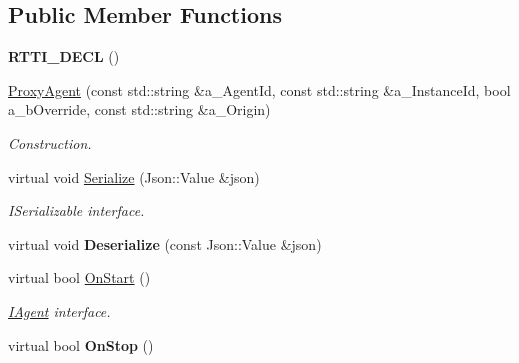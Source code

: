 \subsection*{Public Member Functions}
\begin{DoxyCompactItemize}
\item 
\mbox{\label{class_proxy_agent_ad0260a36883417b4ce4236017920db1c}} 
{\bfseries R\+T\+T\+I\+\_\+\+D\+E\+CL} ()
\item 
\mbox{\label{class_proxy_agent_a0a2258939df1d5e859ad0d94d0f27c47}} 
\hyperlink{class_proxy_agent_a0a2258939df1d5e859ad0d94d0f27c47}{Proxy\+Agent} (const std\+::string \&a\+\_\+\+Agent\+Id, const std\+::string \&a\+\_\+\+Instance\+Id, bool a\+\_\+b\+Override, const std\+::string \&a\+\_\+\+Origin)
\begin{DoxyCompactList}\small\item\em Construction. \end{DoxyCompactList}\item 
\mbox{\label{class_proxy_agent_ae4585a6d5136f5cca0fefc274df20c1b}} 
virtual void \hyperlink{class_proxy_agent_ae4585a6d5136f5cca0fefc274df20c1b}{Serialize} (Json\+::\+Value \&json)
\begin{DoxyCompactList}\small\item\em I\+Serializable interface. \end{DoxyCompactList}\item 
\mbox{\label{class_proxy_agent_ab0c191a60c5d0c57fdb7651f2b1a6994}} 
virtual void {\bfseries Deserialize} (const Json\+::\+Value \&json)
\item 
\mbox{\label{class_proxy_agent_a1b69ba113991aa0c35ce88a3ca5fba47}} 
virtual bool \hyperlink{class_proxy_agent_a1b69ba113991aa0c35ce88a3ca5fba47}{On\+Start} ()
\begin{DoxyCompactList}\small\item\em \hyperlink{class_i_agent}{I\+Agent} interface. \end{DoxyCompactList}\item 
\mbox{\label{class_proxy_agent_a9016f6d25f23c950543807ff564b81ce}} 
virtual bool {\bfseries On\+Stop} ()
\item 
\mbox{\label{class_proxy_agent_a8c14a15f0c3ddde8992688b88b5aa368}} 

\end{DoxyCompactItemize}
